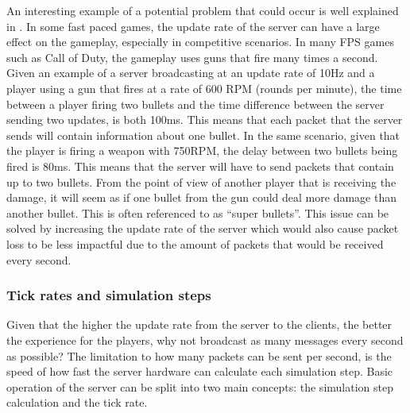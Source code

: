 An interesting example of a potential problem that could occur is well explained in . In some fast paced games, the update rate of the server can have a large effect on the gameplay, especially in competitive scenarios. In many FPS games such as Call of Duty, the gameplay uses guns that fire many times a second. Given an example of a server broadcasting at an update rate of 10Hz and a player using a gun that fires at a rate of 600 RPM (rounds per minute), the time between a player firing two bullets and the time difference between the server sending two updates, is both 100ms. This means that each packet that the server sends will contain information about one bullet. In the same scenario, given that the player is firing a weapon with 750RPM, the delay between two bullets being fired is 80ms. This means that the server will have to send packets that contain up to two bullets. From the point of view of another player that is receiving the damage, it will seem as if one bullet from the gun could deal more damage than another bullet. This is often referenced to as ``super bullets''. This issue can be solved by increasing the update rate of the server which would also cause packet loss to be less impactful due to the amount of packets that would be received every second.


\subsubsection{Tick rates and simulation steps}
Given that the higher the update rate from the server to the clients, the better the experience for the players, why not broadcast as many messages every second as possible? The limitation to how many packets can be sent per second, is the speed of how fast the server hardware can calculate each simulation step. Basic operation of the server can be split into two main concepts: the simulation step calculation and the tick rate.

